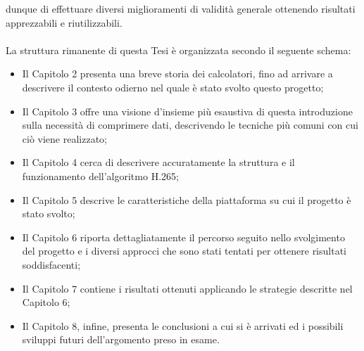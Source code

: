 dunque di effettuare diversi miglioramenti di validità generale ottenendo
risultati apprezzabili e riutilizzabili.
\\ \\
La struttura rimanente di questa Tesi è organizzata secondo il seguente schema:
\begin{itemize}
\item Il Capitolo 2 presenta una breve storia dei calcolatori, fino ad arrivare
      a descrivere il contesto odierno nel quale è stato svolto questo progetto;
\item Il Capitolo 3 offre una visione d'insieme più esaustiva di questa 
      introduzione sulla necessità di comprimere dati, descrivendo le tecniche
      più comuni con cui ciò viene realizzato;
\item Il Capitolo 4 cerca di descrivere accuratamente la struttura e il
      funzionamento dell'algoritmo H.265;
\item Il Capitolo 5 descrive le caratteristiche della piattaforma su cui il
      progetto è stato svolto;
\item Il Capitolo 6 riporta dettagliatamente il percorso seguito nello 
      svolgimento del progetto e i diversi approcci che sono stati tentati per
      ottenere risultati soddisfacenti;
\item Il Capitolo 7 contiene i risultati ottenuti applicando le strategie
      descritte nel Capitolo 6;
\item Il Capitolo 8, infine, presenta le conclusioni a cui si è arrivati ed i
      possibili sviluppi futuri dell'argomento preso in esame.
\end{itemize}